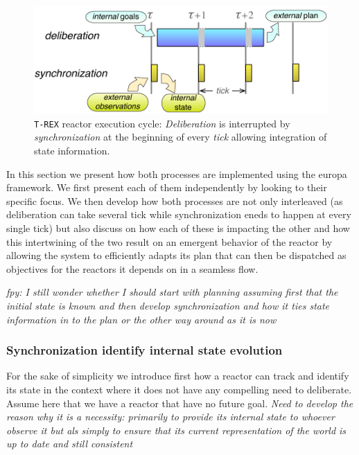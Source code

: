 \begin{figure}[!htbp]
  \centering
  \vskip-1pc
  \includegraphics[width=0.55\columnwidth]{figs/tick-cycle}
  \caption{\small \texttt{T-REX} reactor execution cycle: {\em
      Deliberation} is interrupted by {\em synchronization} at the
    beginning of every {\em tick} allowing integration of state
    information.}
  \label{fig:tick-exec}
  \vskip-0.8pc
\end{figure}


In  this section we present how both processes are implemented using
the europa framework. We first present each of them independently by
looking to their specific focus. We then develop how both processes
are not only interleaved (as deliberation can take several tick while
synchronization eneds to happen at every single tick) but also discuss
on how each of these is impacting the other and how this intertwining 
of the two result on an emergent behavior of the reactor by allowing
the system to efficiently adapts its plan that can then be dispatched
as objectives for the reactors it depends on in a seamless flow. 




{\em fpy: I still wonder whether I should start with planning assuming
  first that the initial state is known and then develop
  synchronization and how it ties state information in to the plan or
  the other way around as it is now}

\subsubsection{Synchronization identify internal state evolution}
\label{sec:arch:synch}


For the sake of simplicity we introduce first how a reactor can track
and identify its state in the context where it does not have any
compelling need to deliberate. Assume here that we have a reactor that
have no future goal. {\em Need to develop the reason why it is a
  necessity: primarily to provide its internal state to whoever
  observe it but als simply to ensure that its current representation
  of the world is up to date and still consistent}

